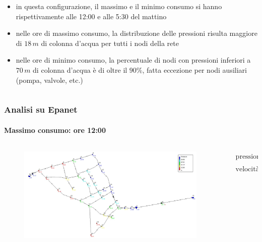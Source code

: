 \documentclass{beamer}
\begin{document}
{\begin{frame}
\begin{columns}
%
	\begin{column}{.5\textwidth}
		\begin{itemize}[<+->]
		\onslide<1>\item in questa configurazione, il massimo e il minimo consumo si hanno rispettivamente alle 12:00 e alle 5:30 del mattino
		\onslide<2>\item nelle ore di massimo consumo, la distribuzione delle pressioni risulta maggiore di $18\,m$ di colonna d'acqua per tutti i nodi della rete
		\onslide<3>\item nelle ore di minimo consumo, la percentuale di nodi con pressioni inferiori a $70\,m$ di colonna d'acqua è di oltre il $90\%$, fatta eccezione per nodi ausiliari (pompa, valvole, etc.)
		\end{itemize}
	\end{column}
 \end{columns}
\end{frame}
}
%
\begin{frame}
	\frametitle{Analisi su Epanet}
	\framesubtitle{Massimo consumo: ore 12:00}
	\begin{columns}
		\begin{column}{.7\textwidth}
				\begin{figure}
					\centering
					\includegraphics[width=\linewidth]{images/pressure_max_demand}
				\end{figure}
		\end{column}
%
		\begin{column}{.3\textwidth}
			\begin{align*}
				&\text{pressioni} \in [15, 70]\,m\\
				&\text{velocit\`a} < 2\,\dfrac{m}{s}
			\end{align*}
		\end{column}
	\end{columns}
\end{frame}
\end{document}
